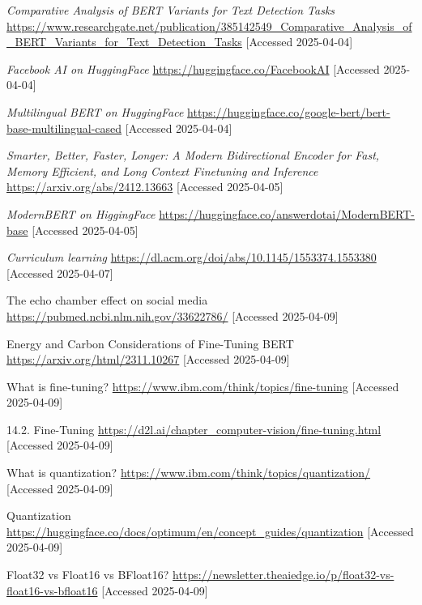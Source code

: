 \documentclass[licencjacka,en]{pracamgr}
\begin{document}
\begin{thebibliography}{99}
    \textit{Comparative Analysis of BERT Variants for Text Detection Tasks}
    \url{https://www.researchgate.net/publication/385142549_Comparative_Analysis_of_BERT_Variants_for_Text_Detection_Tasks}
    [Accessed 2025-04-04]
    
    \textit{Facebook AI on HuggingFace}
    \url{https://huggingface.co/FacebookAI}
    [Accessed 2025-04-04]
    
    \textit{Multilingual BERT on HuggingFace}
    \url{https://huggingface.co/google-bert/bert-base-multilingual-cased}
    [Accessed 2025-04-04]
    
    \textit{Smarter, Better, Faster, Longer: A Modern Bidirectional Encoder for Fast, Memory Efficient, and Long Context Finetuning and Inference}
    \url{https://arxiv.org/abs/2412.13663}
    [Accessed 2025-04-05]
    
    \textit{ModernBERT on HiggingFace}
    \url{https://huggingface.co/answerdotai/ModernBERT-base}
    [Accessed 2025-04-05]
    
    \textit{Curriculum learning}
    \url{https://dl.acm.org/doi/abs/10.1145/1553374.1553380}
    [Accessed 2025-04-07]
    
    The echo chamber effect on social media
    \url{https://pubmed.ncbi.nlm.nih.gov/33622786/}
    [Accessed 2025-04-09]
    
    Energy and Carbon Considerations of Fine-Tuning BERT
    \url{https://arxiv.org/html/2311.10267}
    [Accessed 2025-04-09]
    
    What is fine-tuning?
    \url{https://www.ibm.com/think/topics/fine-tuning}
    [Accessed 2025-04-09]
    
    14.2. Fine-Tuning
    \url{https://d2l.ai/chapter_computer-vision/fine-tuning.html}
    [Accessed 2025-04-09]
    
    What is quantization?
    \url{https://www.ibm.com/think/topics/quantization/}
    [Accessed 2025-04-09]
    
    Quantization
    \url{https://huggingface.co/docs/optimum/en/concept_guides/quantization}
    [Accessed 2025-04-09]
    
    Float32 vs Float16 vs BFloat16?
    \url{https://newsletter.theaiedge.io/p/float32-vs-float16-vs-bfloat16}
    [Accessed 2025-04-09]
    

\end{thebibliography}
\end{document}
